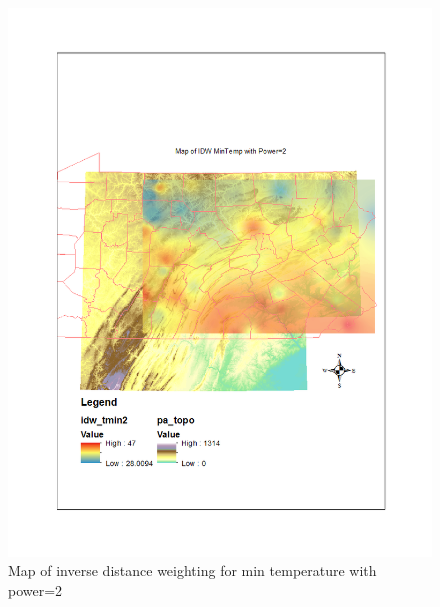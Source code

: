 \documentclass{article}\usepackage[]{graphicx}\usepackage[]{color}
\begin{document}
\begin{figure}
\includegraphics[scale=.9]{./figure/IDWmin2}
\caption{Map of inverse distance weighting for min temperature with power=2}
\label{idwmin2}
\end{figure}
\end{document}
